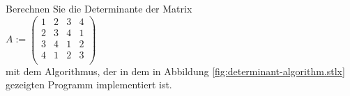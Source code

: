 \exercise
Berechnen Sie die Determinante der Matrix
\\[0.2cm]
\hspace*{1.3cm}
$A := \left(
  \begin{array}{llll}
    1 & 2 & 3 & 4 \\
    2 & 3 & 4 & 1 \\ 
    3 & 4 & 1 & 2 \\ 
    4 & 1 & 2 & 3 \\ 
  \end{array}
\right)
$
\\[0.2cm]
mit dem Algorithmus, der in dem in Abbildung \ref{fig:determinant-algorithm.stlx} gezeigten
Programm implementiert ist.
\exend

